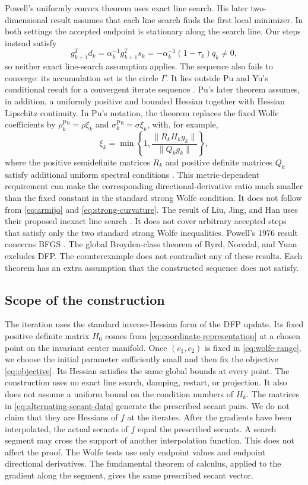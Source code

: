 \documentclass[11pt]{article}
\begin{document}
Powell's uniformly convex theorem \cite{Powell1971} uses exact line search.
His later two-dimensional result \cite{Powell2000} assumes that each line
search finds the first local minimizer.  In both settings the accepted
endpoint is stationary along the search line.  Our steps instead satisfy
\[
g_{k+1}^Td_k=\alpha_k^{-1}g_{k+1}^Ts_k
=-\alpha_k^{-1}(1-\tau_k)q_k\ne0,
\]
so neither exact line-search assumption applies.  The sequence also fails to
converge: its accumulation set is the circle $\Gamma$.  It lies outside
Pu and Yu's conditional result for a convergent iterate sequence
\cite{PuYu1990}.  Pu's later theorem assumes, in addition, a uniformly
positive and bounded Hessian together with Hessian Lipschitz continuity.  In
Pu's notation, the theorem replaces the fixed Wolfe coefficients by
$\rho_k^{\mathrm{Pu}}=\rho\xi_k$ and
$\sigma_k^{\mathrm{Pu}}=\sigma\xi_k$, with, for example,
\[
\xi_k=\min\left\{1,
\frac{\|R_kH_kg_k\|}{\|Q_kg_k\|}\right\},
\]
where the positive semidefinite matrices $R_k$ and positive definite matrices
$Q_k$ satisfy additional uniform spectral conditions
\cite{Pu2002}.  This metric-dependent requirement can make the corresponding
directional-derivative ratio much smaller than the fixed constant in the
standard strong Wolfe condition.  It does not follow from
\eqref{eq:armijo} and \eqref{eq:strong-curvature}.  The result of Liu, Jing,
and Han uses their proposed inexact line search \cite{LiuJingHan2002}.  It
does not cover arbitrary accepted steps that satisfy only the two standard
strong Wolfe inequalities.  Powell's 1976 result concerns BFGS
\cite{Powell1976}.  The global Broyden-class theorem of Byrd, Nocedal, and
Yuan \cite{ByrdNocedalYuan1987} excludes DFP.  The counterexample does not
contradict any of these results.  Each theorem has an extra assumption that
the constructed sequence does not satisfy.

\subsection{Scope of the construction}

The iteration uses the standard inverse-Hessian form of the DFP update.  Its
fixed positive definite matrix $H_0$ comes from
\eqref{eq:coordinate-representation} at a chosen point on the invariant center
manifold.  Once $(c_1,c_2)$ is fixed in \eqref{eq:wolfe-range}, we choose the
initial parameter sufficiently small and then fix the objective
\eqref{eq:objective}.  Its Hessian satisfies the same global bounds at every
point.  The construction uses no exact line search, damping, restart, or
projection.  It also does not assume a uniform bound on the condition numbers
of $H_k$. The matrices in \eqref{eq:alternating-secant-data} generate the prescribed
secant pairs.  We do not claim that they are Hessians of $f$ at the iterates.
After the gradients have been interpolated, the actual secants of $f$ equal
the prescribed secants.  A search segment may cross the support of another
interpolation function.  This does not affect the proof.  The Wolfe tests use
only endpoint values and endpoint directional derivatives.  The fundamental
theorem of calculus, applied to the gradient along the segment, gives the same
prescribed secant vector.
\end{document}
